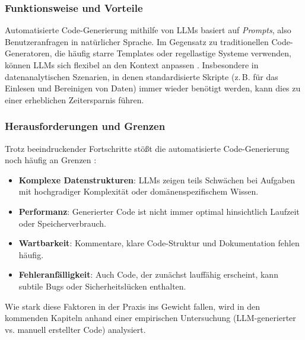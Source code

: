 \documentclass[11pt,a4paper]{article}
\begin{document}
\subsubsection{Funktionsweise und Vorteile}
Automatisierte Code-Generierung mithilfe von LLMs basiert auf \emph{Prompts}, also Benutzeranfragen in natürlicher Sprache. Im Gegensatz zu traditionellen Code-Generatoren, die häufig starre Templates oder regellastige Systeme verwenden, können LLMs sich flexibel an den Kontext anpassen \cite{chen2021evaluatinglargelanguagemodels}. Insbesondere in datenanalytischen Szenarien, in denen standardisierte Skripte (z.\,B. für das Einlesen und Bereinigen von Daten) immer wieder benötigt werden, kann dies zu einer erheblichen Zeitersparnis führen.

\subsubsection{Herausforderungen und Grenzen}
Trotz beeindruckender Fortschritte stößt die automatisierte Code-Generierung noch häufig an Grenzen \cite{nijkamp2023codegenopenlargelanguage,wang2021codet5identifierawareunifiedpretrained}:
\begin{itemize}
    \item \textbf{Komplexe Datenstrukturen}: LLMs zeigen teils Schwächen bei Aufgaben mit hochgradiger Komplexität oder domänenspezifischem Wissen.
    \item \textbf{Performanz}: Generierter Code ist nicht immer optimal hinsichtlich Laufzeit oder Speicherverbrauch.
    \item \textbf{Wartbarkeit}: Kommentare, klare Code-Struktur und Dokumentation fehlen häufig.
    \item \textbf{Fehleranfälligkeit}: Auch Code, der zunächst lauffähig erscheint, kann subtile Bugs oder Sicherheitslücken enthalten.
\end{itemize}

Wie stark diese Faktoren in der Praxis ins Gewicht fallen, wird in den kommenden Kapiteln anhand einer empirischen Untersuchung (LLM-generierter vs. manuell erstellter Code) analysiert.
\newpage
\end{document}
